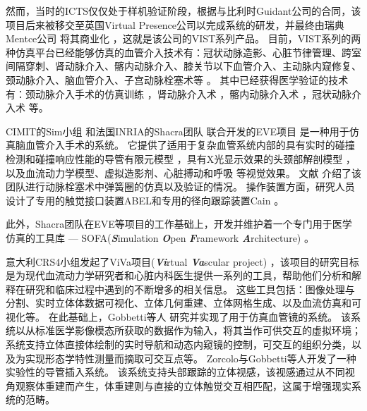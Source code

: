 然而，当时的ICTS仅仅处于样机验证阶段，根据与比利时Guidant公司的合同，该项目后来被移交至英国Virtual Presence公司以完成系统的研发，并最终由瑞典Mentce公司 \cite{menticeweb}将其商业化 \cite{GuidantMenticeNewsWeb,coles2011surveyCRaIVE}，这就是该公司的VIST系列产品。%
目前，VIST系列的两种仿真平台已经能够仿真的血管介入技术有：冠状动脉造影、心脏节律管理、跨室间隔穿刺、肾动脉介入、髂内动脉介入、膝关节以下血管介入、主动脉内窥修复、颈动脉介入、脑血管介入、子宫动脉栓塞术等 \cite{menticeweb}。%
其中已经获得医学验证的技术有：颈动脉介入手术的仿真训练 \cite{Dayal2004VIST,Hsu2004VIST,Nicholson2006VIST,Patel2006VIST,Cates2007VIST,VanHerzeele2009VIST}，肾动脉介入术 \cite{Aggarwal2006,Glaiberman2008VIST}，髂内动脉介入术 \cite{Chaer2006VIST,Berry2007VIST,VanHerzeele2008VIST}，冠状动脉介入术 \cite{Gallagher2006VIST}等。%

CIMIT的Sim小组 \cite{medicalsimweb}和法国INRIA的Shacra团队 \cite{shacraweb}联合开发的EVE项目 \cite{Wu2005EVE}是一种用于仿真脑血管介入手术的系统。
它提供了适用于复杂血管系统内部的具有实时的碰撞检测和碰撞响应性能的导管有限元模型 \cite{dequidt2007EVE,Duriez2006EVE,Lenoir2006EVE,Lenoir2005EVE,Cotin2005EVE}，具有X光显示效果的头颈部解剖模型 \cite{Wu2011EVE,Luboz2005EVE,Muniyandi2003EVE}，以及血流动力学模型、虚拟造影剂、心脏搏动和呼吸 \cite{Wu2007EVE}等视觉效果。%
文献 \cite{Dequidt2008EVE}介绍了该团队进行动脉栓塞术中弹簧圈的仿真以及验证的情况。
操作装置方面，研究人员设计了专用的触觉接口装置ABEL和专用的径向跟踪装置Cain \cite{medicalsimweb}。

此外，Shacra团队在EVE等项目的工作基础上，开发并维护着一个专门用于医学仿真的工具库 --- SOFA(\textbf{\textit{S}}imulation \textbf{\textit{O}}pen \textbf{\textit{F}}ramework \textbf{\textit{A}}rchitecture) \cite{Allard2007SOFA}。%

意大利CRS4小组发起了ViVa项目(\textbf{\textit{Vi}}rtual \textbf{\textit{Va}}scular project) \cite{abdoulaev1998}，该项目的研究目标是为现代血流动力学研究者和心脏内科医生提供一系列的工具，帮助他们分析和解释在研究和临床过程中遇到的不断增多的相关信息。%
这些工具包括：图像处理与分割、实时立体体数据可视化、立体几何重建、立体网格生成、以及血流仿真和可视化等。
在此基础上，Gobbetti等人 \cite{Gobbetti1998}研究并实现了用于仿真血管镜的系统。
该系统以从标准医学影像模态所获取的数据作为输入，将其当作可供交互的虚拟环境；系统支持立体直接体绘制的实时导航和动态内窥镜的控制，可交互的组织分类，以及为实现形态学特性测量而摘取可交互点等。
Zorcolo与Gobbetti等人\cite{Zorcolo1999,Gobbetti2000,Zorcolo2000}开发了一种实验性的导管插入系统。
该系统支持头部跟踪的立体视感，该视感通过从不同视角观察体重建而产生，体重建则与直接的立体触觉交互相匹配，这属于增强现实系统的范畴。

